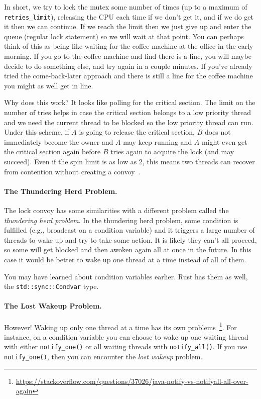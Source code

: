 \documentclass[a4paper]{report}
\begin{document}
In short, we try to lock the mutex some number of times (up to a maximum of \texttt{retries\_limit}), releasing the CPU each time if we don't get it, and if we do get it then we can continue. If we reach the limit then we just give up and enter the queue (regular lock statement) so we will wait at that point. You can perhaps think of this as being like waiting for the coffee machine at the office in the early morning. If you go to the coffee machine and find there is a line, you will maybe decide to do something else, and try again in a couple minutes. If you've already tried the come-back-later approach and there is still a line for the coffee machine you might as well get in line.

Why does this work? It looks like polling for the critical section. The limit on the number of tries helps in case the critical section belongs to a low priority thread and we need the current thread to be blocked so the low priority thread can run. Under this scheme, if $A$ is going to release the critical section, $B$ does not immediately become the owner and $A$ may keep running and $A$ might even get the critical section again before $B$ tries again to acquire the lock (and may succeed). Even if the spin limit is as low as 2, this means two threads can recover from contention without creating a convoy~\cite{lockconvoys}. 

\paragraph{The Thundering Herd Problem.} The lock convoy has some similarities with a different problem called the \textit{thundering herd problem}. In the thundering herd problem, some condition is fulfilled (e.g., broadcast on a condition variable) and it triggers a large number of threads to wake up and try to take some action. It is likely they can't all proceed, so some will get blocked and then awoken again all at once in the future. In this case it would be better to wake up one thread at a time instead of all of them.

You may have learned about condition variables earlier. Rust has them as well, the \texttt{std::sync::Condvar} type.

\paragraph{The Lost Wakeup Problem.} However! Waking up only one thread at a time has its own problems~\footnote{\url{https://stackoverflow.com/questions/37026/java-notify-vs-notifyall-all-over-again}}. For instance, on a condition variable you can choose to wake up one waiting thread with either \texttt{notify\_one()} or all waiting threads with \texttt{notify\_all()}. If you use \texttt{notify\_one()}, then you can encounter the \textit{lost wakeup} problem.
\end{document}
